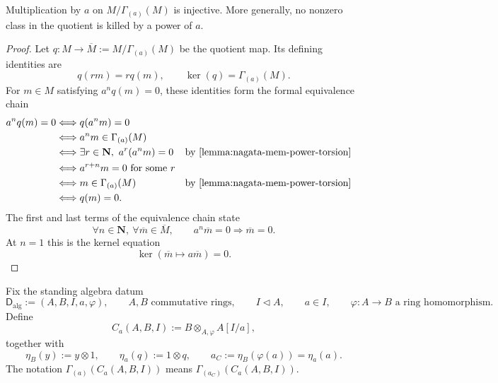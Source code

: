 \begin{lemma}
  \label{lemma:nagata-power-torsion-quotient-torsionfree}
  \lean{}

  Multiplication by $a$ on $M/\Gamma_{(a)}(M)$ is injective.  More generally,
  no nonzero class in the quotient is killed by a power of $a$.
\end{lemma}

\begin{proof}
  Let
  $q\colon M\to\overline M:=M/\Gamma_{(a)}(M)$ be the quotient map.  Its
  defining identities are
  \[
    q(rm)=r q(m),\qquad
    \ker(q)=\Gamma_{(a)}(M).
  \]
  For $m\in M$ satisfying $a^nq(m)=0$, these identities form the formal
  equivalence chain
  \[
  \begin{aligned}
    a^nq(m)=0
      &\Longleftrightarrow q(a^nm)=0\\
      &\Longleftrightarrow a^nm\in\Gamma_{(a)}(M)\\
      &\Longleftrightarrow
        \exists r\in\mathbf N,\ a^r(a^nm)=0
        &&\text{by \Cref{lemma:nagata-mem-power-torsion}}\\
      &\Longleftrightarrow a^{r+n}m=0\text{ for some }r\\
      &\Longleftrightarrow m\in\Gamma_{(a)}(M)
        &&\text{by \Cref{lemma:nagata-mem-power-torsion}}\\
      &\Longleftrightarrow q(m)=0.
  \end{aligned}
  \]
  The first and last terms of the equivalence chain state
  \[
    \forall n\in\mathbf N,\ \forall\overline m\in\overline M,\qquad
    a^n\overline m=0\Longrightarrow\overline m=0.
  \]
  At $n=1$ this is the kernel equation
  \[
    \ker(\overline m\mapsto a\overline m)=0.
  \]
\end{proof}

\begin{definition}
  \label{def:nagata-strict-transform-basechange-chart-ring}
  \lean{}

  Fix the standing algebra datum
  \[
    \mathsf D_{\mathrm{alg}}
      :=(A,B,I,a,\varphi),\qquad
    A,B\text{ commutative rings},\qquad
    I\triangleleft A,\qquad a\in I,\qquad
    \varphi\colon A\to B\text{ a ring homomorphism}.                \tag{STAlg0}
  \]
  Define
  \[
    C_a(A,B,I):=B\otimes_{A,\varphi}A[I/a],
  \]
  together with
  \[
    \eta_B(y):=y\otimes1,\qquad
    \eta_a(q):=1\otimes q,\qquad
    a_C:=\eta_B(\varphi(a))=\eta_a(a).
  \]
  The notation $\Gamma_{(a)}(C_a(A,B,I))$ means
  $\Gamma_{(a_C)}(C_a(A,B,I))$.
\end{definition}

